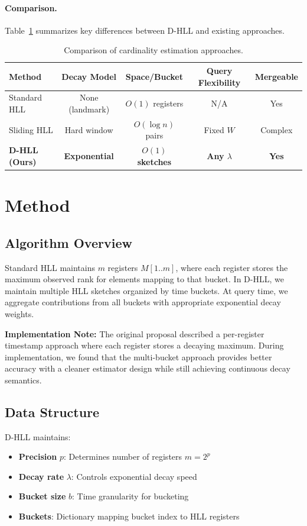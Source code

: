 \documentclass{article}
\begin{document}
\paragraph{Comparison.}
Table~\ref{tab:comparison} summarizes key differences between D-HLL and existing approaches.

\begin{table}[t]
\caption{Comparison of cardinality estimation approaches.}
\label{tab:comparison}
\centering
\begin{tabular}{lcccc}
\toprule
Method & Decay Model & Space/Bucket & Query Flexibility & Mergeable \\
\midrule
Standard HLL & None (landmark) & $O(1)$ registers & N/A & Yes \\
Sliding HLL & Hard window & $O(\log n)$ pairs & Fixed $W$ & Complex \\
\textbf{D-HLL (Ours)} & \textbf{Exponential} & \textbf{$O(1)$ sketches} & \textbf{Any $\lambda$} & \textbf{Yes} \\
\bottomrule
\end{tabular}
\end{table}

\section{Method}\label{sec:method}

\subsection{Algorithm Overview}

Standard HLL maintains $m$ registers $M[1..m]$, where each register stores the maximum observed rank for elements mapping to that bucket. In D-HLL, we maintain multiple HLL sketches organized by time buckets. At query time, we aggregate contributions from all buckets with appropriate exponential decay weights.

\textbf{Implementation Note:} The original proposal described a per-register timestamp approach where each register stores a decaying maximum. During implementation, we found that the multi-bucket approach provides better accuracy with a cleaner estimator design while still achieving continuous decay semantics.

\subsection{Data Structure}

D-HLL maintains:
\begin{itemize}
    \item \textbf{Precision} $p$: Determines number of registers $m = 2^p$
    \item \textbf{Decay rate} $\lambda$: Controls exponential decay speed
    \item \textbf{Bucket size} $b$: Time granularity for bucketing
    \item \textbf{Buckets}: Dictionary mapping bucket index to HLL registers
\end{itemize}
\end{document}
